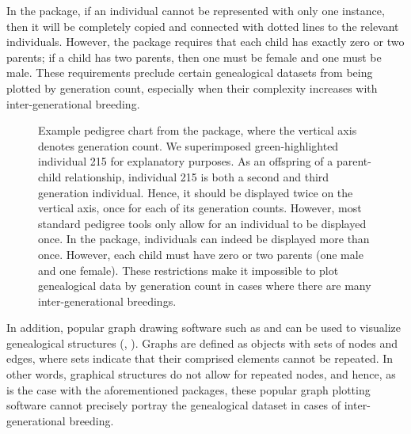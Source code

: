 \documentclass[article,shortnames]{jss}
\begin{document}
In the  package, if an individual cannot be represented with only one instance, then it will be completely copied and connected with dotted lines to the relevant individuals. However, the package requires that each child has exactly zero or two parents; if a child has two parents, then one must be female and one must be male. These requirements preclude certain genealogical datasets from being plotted by generation count, especially when their complexity increases with inter-generational breeding.

\begin{figure}[H]
    \centering
    \caption{Example pedigree chart from the  package, where the vertical axis denotes generation count. We superimposed green-highlighted individual 215 for explanatory purposes. As an offspring of a parent-child relationship, individual 215 is both a second and third generation individual. Hence, it should be displayed twice on the vertical axis, once for each of its generation counts. However, most standard pedigree tools only allow for an individual to be displayed once. In the  package, individuals can indeed be displayed more than once. However, each child must have zero or two parents (one male and one female). These restrictions make it impossible to plot genealogical data by generation count in cases where there are many inter-generational breedings.}
    \label{fig:kinshipFig}
\end{figure}

In addition, popular graph drawing software such as  and  can be used to visualize genealogical structures (\citealt{graphvizCit}, \citealt{cytoscapeCit}). Graphs are defined as objects with sets of nodes and edges, where sets indicate that their comprised elements cannot be repeated. In other words, graphical structures do not allow for repeated nodes, and hence, as is the case with the aforementioned  packages, these popular graph plotting software cannot precisely portray the genealogical dataset in cases of inter-generational breeding.
\end{document}
